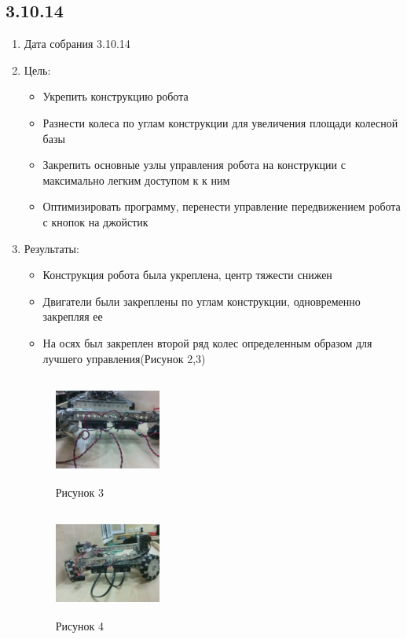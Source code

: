 \documentclass[11pt]{article}
\begin{document}
	\subsection{3.10.14}
	\begin{enumerate}
		\item Дата собрания 3.10.14
		\item Цель:
		\begin{itemize}
			\item Укрепить конструкцию робота
			\item Разнести колеса по углам конструкции для увеличения площади колесной базы
			\item Закрепить основные узлы управления робота на конструкции с максимально легким доступом к к ним
			\item Оптимизировать программу, перенести управление передвижением робота с кнопок на джойстик
		\end{itemize}
		\item Результаты:
		\begin{itemize}
			\item Конструкция робота была укреплена, центр тяжести снижен 
			\item Двигатели были закреплены по углам конструкции, одновременно закрепляя ее
			\item На осях был закреплен второй ряд колес определенным образом для лучшего управления(Рисунок 2,3)
		\end{itemize}
		\begin{figure} [h]
			\centering
			\begin{minipage}{0.3\linewidth}
				\includegraphics[width=35mm,height=35mm]{3_1_robot}\\ Рисунок 3
			\end{minipage}
			\begin{minipage}{0.3\linewidth}
				\includegraphics[width=35mm,height=35mm]{3_2_robot}\\ Рисунок 4

\end{minipage}
\end{figure}
\end{enumerate}
\end{document}
